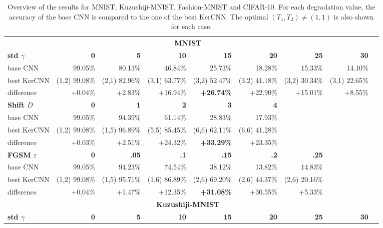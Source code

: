 \documentclass[11pt,oneside,reqno]{amsart}
\begin{document}
 {\renewcommand{\arraystretch}{.7} \begin{table}[htbp!]
 \centering
 \tiny
  \caption{Overview of the results for MNIST, Kuzushiji-MNIST, Fashion-MNIST and CIFAR-10. For each degradation value, the accuracy of the base CNN is compared to the one of the best KerCNN. The optimal $(T_1,T_2)\neq(1,1)$ is also shown for each case.}
 \label{tab:overview}
 \begin{tabular}{@{}lrrrrrrrr@{}}
 \toprule
      \multicolumn{8}{c}{\textbf{MNIST}}\vspace{5pt}\\
      \textbf{std $\gamma$} & \textbf{0} & \textbf{5} & \textbf{10} & \textbf{15} & \textbf{20} & \textbf{25} & \textbf{30} \\ 
      base CNN & 99.05\% & 80.13\% & 46.84\% & 25.73\% & 18.28\% & 15.33\% & 14.10\% \\ 
      best KerCNN & (1,2) 99.08\% & (2,1) 82.96\% & (3,1) 63.77\% & (3,2) 52.47\% & (3,2) 41.18\% & (3,2) 30.34\% & (3,1) 22.65\% \\
      difference & +0.04\% & +2.83\% & +16.94\% & \textbf{+26.74\%} & +22.90\% & +15.01\% & +8.55\% \vspace{5pt}\\  
      \textbf{Shift $D$} & \textbf{0} & \textbf{1} & \textbf{2} & \textbf{3} & \textbf{4} & & \\
    base CNN & 99.05\% & 94.39\% & 61.14\% & 28.83\% & 17.93\% & & \\ 
      best KerCNN & (1,2) 99.08\% & (1,5) 96.89\% & (5,5) 85.45\% & (6,6) 62.11\% & (6,6) 41.28\% & &  \\
    difference & +0.03\% & +2.51\% & +24.32\% & \textbf{+33.29\%} & +23.35\% & & \vspace{5pt}\\
    \textbf{FGSM $\varepsilon$} & \textbf{0} & \textbf{.05} & \textbf{.1} & \textbf{.15} & \textbf{.2} & \textbf{.25} & \\
    base CNN & 99.05\% & 94.23\% & 74.54\% & 38.12\% & 13.82\% & 14.83\% & \\ 
    best KerCNN & (1,2) 99.08\% & (1,5) 95.71\% & (1,6) 86.89\% & (2,6) 69.20\% & (2,6) 44.37\% & (2,6) 20.16\% & \\
    difference & +0.04\% & +1.47\% & +12.35\% & \textbf{+31.08\%} & +30.55\% & +5.33\% & \\
     \midrule
      \multicolumn{8}{c}{\textbf{Kuzushiji-MNIST}}\vspace{5pt}\\
      \textbf{std $\gamma$} & \textbf{0} & \textbf{5} & \textbf{10} & \textbf{15} & \textbf{20} & \textbf{25} & \textbf{30} \\

\end{tabular}
\end{table}}
\end{document}

